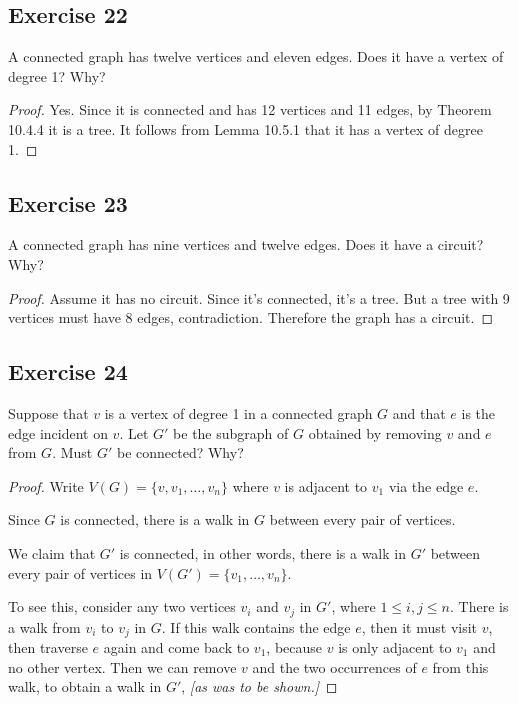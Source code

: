 \documentclass[14pt]{extarticle}
\begin{document}
\subsection{Exercise 22}
A connected graph has twelve vertices and eleven edges. Does it have a vertex of degree 1? Why?

\begin{proof}
Yes. Since it is connected and has 12 vertices and 11 edges, by Theorem 10.4.4 it is a tree. It follows from Lemma 10.5.1 
that it has a vertex of degree 1.
\end{proof}

\subsection{Exercise 23}
A connected graph has nine vertices and twelve edges. Does it have a circuit? Why?

\begin{proof}
Assume it has no circuit. Since it's connected, it's a tree. But a tree with 9 vertices must have 8 edges, contradiction.
Therefore the graph has a circuit.
\end{proof}

\subsection{Exercise 24}
Suppose that \(v\) is a vertex of degree 1 in a connected graph \(G\) and that \(e\) is the edge incident on \(v\). Let 
\(G'\) be the subgraph of \(G\) obtained by removing \(v\) and \(e\) from \(G\). Must \(G'\) be connected? Why?

\begin{proof}
Write \(V(G) = \{v, v_1, \ldots, v_n\}\) where \(v\) is adjacent to \(v_1\) via the edge \(e\).

Since \(G\) is connected, there is a walk in \(G\) between every pair of vertices.

We claim that \(G'\) is connected, in other words, there is a walk in \(G'\) between every pair of vertices in \(V(G') = 
\{v_1, \ldots, v_n\}\). 

To see this, consider any two vertices \(v_i\) and \(v_j\) in \(G'\), where \(1 \leq i, j \leq n\). There is a walk from \(v_i\) to \(v_j\) in \(G\). If this walk contains the edge \(e\), then it must visit \(v\), then traverse \(e\) again and
come back to \(v_1\), because \(v\) is only adjacent to \(v_1\) and no other vertex. Then we can remove \(v\) and the 
two occurrences of \(e\) from this walk, to obtain a walk in \(G'\), {\it [as was to be shown.]}
\end{proof}
\end{document}

